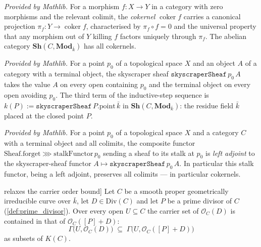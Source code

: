 \begin{definition}
  \label{def:cokernel_mathlib}
  \mathlibok
  \textit{Provided by Mathlib.}
  For a morphism \(f : X \to Y\) in a category with zero morphisms and the
  relevant colimit, the \emph{cokernel} \(\operatorname{coker} f\) carries a
  canonical projection \(\pi_f : Y \to \operatorname{coker} f\), characterised
  by \(\pi_f \circ f = 0\) and the universal property that any morphism out of
  \(Y\) killing \(f\) factors uniquely through \(\pi_f\). The abelian category
  \(\mathbf{Sh}(C, \mathbf{Mod}_{\bar k})\) has all cokernels.
\end{definition}

\begin{definition}
  \label{def:skyscraperSheaf_mathlib}
  \mathlibok
  \textit{Provided by Mathlib.}
  For a point \(p_0\) of a topological space \(X\) and an object \(A\) of a
  category with a terminal object, the skyscraper sheaf
  \(\texttt{skyscraperSheaf}\,p_0\,A\) takes the value \(A\) on every open
  containing \(p_0\) and the terminal object on every open avoiding \(p_0\).
  The third term of the inductive-step sequence is
  \(k(P) := \texttt{skyscraperSheaf}\,P.\mathrm{point}\,\bar k\) in
  \(\mathbf{Sh}(C, \mathbf{Mod}_{\bar k})\): the residue field \(\bar k\)
  placed at the closed point \(P\).
\end{definition}

\begin{lemma}
  \label{lem:stalkSkyscraperSheafAdjunction_mathlib}
  \mathlibok
  \textit{Provided by Mathlib.}
  For a point \(p_0\) of a topological space \(X\) and a category \(C\) with a
  terminal object and all colimits, the composite functor
  \(\mathrm{Sheaf.forget} \mathbin{⋙} \mathrm{stalkFunctor}\,p_0\) sending a
  sheaf to its stalk at \(p_0\) is \emph{left adjoint} to the skyscraper-sheaf
  functor \(A \mapsto \texttt{skyscraperSheaf}\,p_0\,A\). In particular this
  stalk functor, being a left adjoint, preserves all colimits --- in particular
  cokernels.
\end{lemma}

\begin{lemma}

\leanok
[Adding \([P]\) relaxes the carrier order bound]
  \label{lem:carrierSet_le_add_single}
  Let \(C\) be a smooth proper geometrically irreducible curve over
  \(\bar k\), let \(D \in \mathrm{Div}(C)\) and let \(P\) be a prime divisor
  of \(C\) (\cref{def:prime_divisor}). Over every open \(U \subseteq C\) the
  carrier set of \(\mathcal O_C(D)\) is contained in that of
  \(\mathcal O_C([P]+D)\):
  \[
    \Gamma\bigl(U, \mathcal O_C(D)\bigr) \;\subseteq\;
    \Gamma\bigl(U, \mathcal O_C([P]+D)\bigr)
  \]
  as subsets of \(K(C)\).
\end{lemma}

